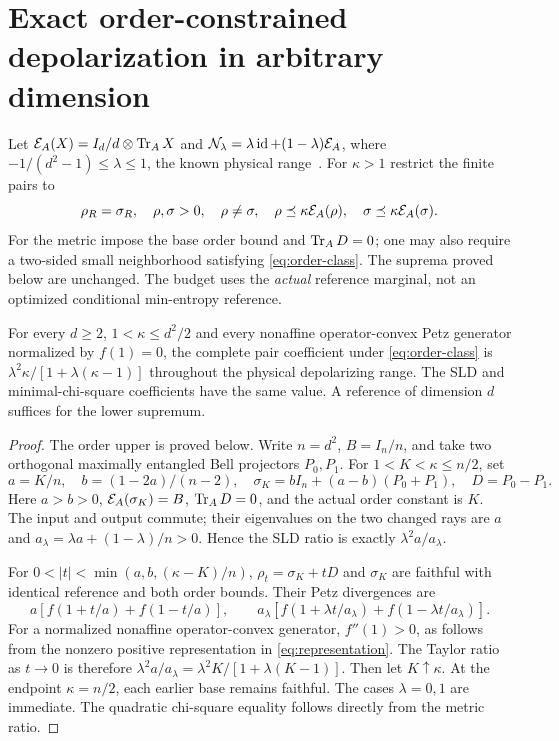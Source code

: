 \section{Exact order-constrained depolarization in arbitrary dimension}\label{sec:order}
Let \(\mathcal E_A(X)=I_d/d\otimes\operatorname{Tr}_AX\) and
\(\mathcal N_\lambda=\lambda\operatorname{id}+(1-\lambda)\mathcal E_A\), where
\(-1/(d^2-1)\le\lambda\le1\), the known physical range~\cite[Section~8.1]{HRF}. For \(\kappa>1\) restrict the finite pairs to
\begin{equation}\label{eq:order-class}
 \rho_R=\sigma_R,\quad \rho,\sigma>0,\quad \rho\ne\sigma,\quad
 \rho\preceq\kappa\mathcal E_A(\rho),\quad \sigma\preceq\kappa\mathcal E_A(\sigma).
\end{equation}
For the metric impose the base order bound and \(\operatorname{Tr}_AD=0\); one may also require a two-sided small neighborhood satisfying \eqref{eq:order-class}. The suprema proved below are unchanged. The budget uses the \emph{actual} reference marginal, not an optimized conditional min-entropy reference.

\begin{proposition}\label{prop:bell}
For every \(d\ge2\), \(1<\kappa\le d^2/2\) and every nonaffine operator-convex Petz generator normalized by \(f(1)=0\), the complete pair coefficient under \eqref{eq:order-class} is
\(\lambda^2\kappa/[1+\lambda(\kappa-1)]\) throughout the physical depolarizing range. The SLD and minimal-chi-square coefficients have the same value. A reference of dimension \(d\) suffices for the lower supremum.
\end{proposition}
\begin{proof}
The order upper is proved below. Write \(n=d^2\), \(B=I_n/n\), and take two orthogonal maximally entangled Bell projectors \(P_0,P_1\). For \(1<K<\kappa\le n/2\), set
\[
 a=K/n,\quad b=(1-2a)/(n-2),\quad
 \sigma_K=bI_n+(a-b)(P_0+P_1),\quad D=P_0-P_1.
\]
Here \(a>b>0\), \(\mathcal E_A(\sigma_K)=B\), \(\operatorname{Tr}_AD=0\), and the actual order constant is \(K\). The input and output commute; their eigenvalues on the two changed rays are \(a\) and \(a_\lambda=\lambda a+(1-\lambda)/n>0\). Hence the SLD ratio is exactly \(\lambda^2a/a_\lambda\).

For \(0<|t|<\min(a,b,(\kappa-K)/n)\), \(\rho_t=\sigma_K+tD\) and \(\sigma_K\) are faithful with identical reference and both order bounds. Their Petz divergences are
\[
 a\left[f(1+t/a)+f(1-t/a)\right],\qquad
 a_\lambda\left[f(1+\lambda t/a_\lambda)+f(1-\lambda t/a_\lambda)\right].
\]
For a normalized nonaffine operator-convex generator, \(f''(1)>0\), as follows from the nonzero positive representation in \eqref{eq:representation}. The Taylor ratio as \(t\to0\) is therefore \(\lambda^2a/a_\lambda=\lambda^2K/[1+\lambda(K-1)]\). Then let \(K\uparrow\kappa\). At the endpoint \(\kappa=n/2\), each earlier base remains faithful. The cases \(\lambda=0,1\) are immediate. The quadratic chi-square equality follows directly from the metric ratio.
\end{proof}

